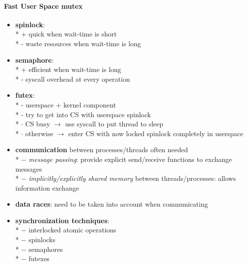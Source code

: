 \paragraph{Fast User Space mutex}
\begin{itemize}
  \item \textbf{spinlock}: \\*
    + quick when wait-time is short \\*
    - waste resources when wait-time is long
  \item \textbf{semaphore}: \\*
    + efficient when wait-time is long \\*
    - syscall overhead at every operation
  \item \textbf{futex}: \\*
    - userspace + kernel component \\*
    - try to get into CS with userspace spinlock \\*
    \phantom{-} \( \cdot \) CS busy \( \to \) use syscall to put thread to sleep \\*
    \phantom{-} \( \cdot \) otherwise \( \to \) enter CS with now locked spinlock completely in userspace
\end{itemize}

\begin{summary}
  \begin{itemize}
    \item \textbf{communication} between processes/threads often needed \\*
      $ - $ \emph{message passing}: provide explicit send/receive functions to exchange messages \\*
      $ - $ \emph{implicitly/explicitly shared memory} between threads/processes: allows information exchange
    \item \textbf{data races}: need to be taken into account when communicating
    \item \textbf{synchronization techniques}: \\*
      $ - $ interlocked atomic operations \\*
      $ - $ spinlocks \\*
      $ - $ semaphores \\*
      $ - $ futexes
  \end{itemize}
\end{summary}